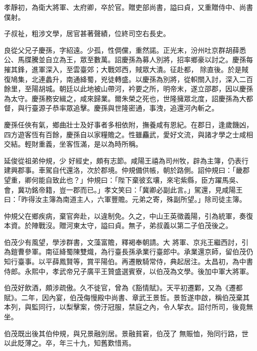 \begin{pinyinscope}
 孝靜初，為衛大將軍、太府卿，卒於官。贈吏部尚書，謚曰貞，又重贈侍中、尚書僕射。



 子叔祉，粗涉文學，居官甚著聲績，位終司空右長史。



 良從父兄子慶孫，字紹遠。少孤，性倜儻，重然諾。正光末，汾州吐京群胡薛悉公、馬牒騰並自立為王，眾至數萬。詔慶孫為募人別將，招率鄉豪以討之。慶孫每摧其鋒，進軍深入，至雲臺郊；大戰郊西，賊眾大潰。征赴都，
 除直後。於是賊復鳩集，北連蠡升，南通絳蜀，兇徒轉盛。以慶孫為別將，從軹關入討，深入二百餘里，至陽胡城。朝廷以此地被山帶河，衿要之所，明帝末，遂立邵郡，因以慶孫為太守。慶孫務安緝之，咸來歸業。爾朱榮之死也，世隆擁眾北度，詔慶孫為大都督，與行臺源子恭率眾追擊。慶孫與世隆密通，事洩，追還河內斬之。



 慶孫任俠有氣，鄉曲壯士及好事者多相依附，撫養咸有恩紀。在郡日，逢歲饑凶，四方遊客恆有百餘，慶孫自以家糧贍之。性雖麤武，愛好文流，與諸才學之士咸相交結。輕財重義，坐客恆滿，是以為時所稱。



 延俊從祖弟仲規，少
 好經史，頗有志節。咸陽王禧為司州牧，辟為主簿，仍表行建興郡事。車駕自代還洛，次於郡境。仲規備供帳，朝於路側。詔仲規曰：「畿郡望重，卿何能自致此也？」仲規曰：「陛下棄彼玄壤，來宅紫縣，臣方躍馬吳、會，冀功銘帝籍，豈一郡而已。」孝文笑曰：「冀卿必副此言。」駕還，見咸陽王曰：「昨得汝主簿為南道主人，六軍豐贍。元弟之寄，殊副所望。」除司徒主簿。



 仲規父在鄉疾病，棄官奔赴，以違制免。久之，中山王英徵義陽，引為統軍，奏復本資。於陣戰沒。贈河東太守，謚曰貞。無子，弟叔義以第二子伯茂後之。



 伯茂少有風望，學涉群書，文藻富贍，釋褐奉朝請。大
 將軍、京兆王繼西討，引為鎧曹參軍。南征絳蜀陳雙熾，為行臺長孫承業行臺郎中。承業還京師，留伯茂仍知行臺事。以平薛鳳賢等，賞平陽伯。再遷散騎常侍，典起居注。太昌初，為中書侍郎。永熙中，孝武帝兄子廣平王贊盛選賓寮，以伯茂為文學。後加中軍大將軍。



 伯茂好飲酒，頗涉疏傲。久不徙官，曾為《豁情賦》。天平初遷鄴，又為《遷都賦》。二年，因內宴，伯茂侮慢殿中尚書、章武王景哲。景哲遂申啟，稱伯茂棄其本列，與監同行，以梨擊案，傍汙冠服，禁庭之內，令人挈衣。詔付所司，後竟無坐。



 伯茂既出後其伯仲規，與兄景融別居。景融貧窘，伯茂了
 無賑恤，殆同行路，世以此貶薄之。卒，年三十九，知舊歎惜焉。




\end{pinyinscope}
